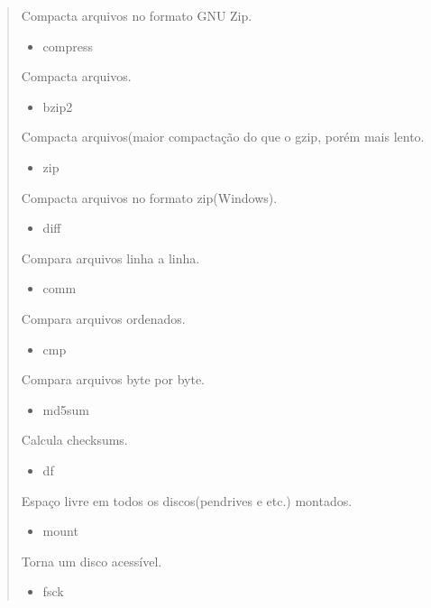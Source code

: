 \documentclass[a4paper,10pt,brazil]{sphinxmanual}
\begin{document}
\begin{quote}
\begin{description}
Compacta arquivos no formato GNU Zip.
\begin{itemize}
\item {} 
compress

\end{itemize}

Compacta arquivos.
\begin{itemize}
\item {} 
bzip2

\end{itemize}

Compacta arquivos(maior compactação do que o gzip, porém
mais lento.
\begin{itemize}
\item {} 
zip

\end{itemize}

Compacta arquivos no formato zip(Windows).
\begin{itemize}
\item {} 
diff

\end{itemize}

Compara arquivos linha a linha.
\begin{itemize}
\item {} 
comm

\end{itemize}

Compara arquivos ordenados.
\begin{itemize}
\item {} 
cmp

\end{itemize}

Compara arquivos byte por byte.
\begin{itemize}
\item {} 
md5sum

\end{itemize}

Calcula checksums.
\begin{itemize}
\item {} 
df

\end{itemize}

Espaço livre em todos os discos(pendrives e etc.) montados.
\begin{itemize}
\item {} 
mount

\end{itemize}

Torna um disco acessível.
\begin{itemize}
\item {} 
fsck


\end{itemize}
\end{description}
\end{quote}
\end{document}
